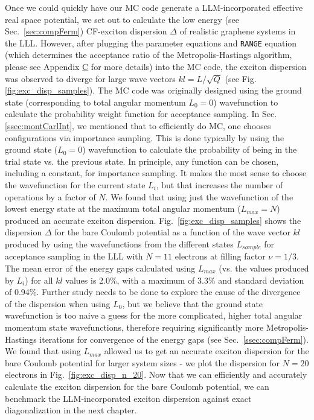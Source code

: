     Once we could quickly have our MC code generate a LLM-incorporated effective real space potential, we set out to calculate the low energy (see Sec.~\ref{sec:compFerm}) CF-exciton dispersion $\Delta$ of realistic graphene systems in the LLL. However, after plugging the parameter equations and \texttt{RANGE} equation (which determines the acceptance ratio of the Metropolis-Hastings algorithm, please see Appendix \hyperref[appendixC]{C} for more details) into the MC code, the exciton dispersion was observed to diverge for large wave vectors $kl=L/\sqrt{Q}$ (see Fig. \ref{fig:exc_disp_samples}). The MC code was originally designed using the ground state (corresponding to total angular momentum $L_0=0$) wavefunction to calculate the probability weight function for acceptance sampling. In Sec. \ref{ssec:montCarlInt}, we mentioned that to efficiently do MC, one chooses configurations via importance sampling. This is done typically by using the ground state ($L_0=0$) wavefunction to calculate the probability of being in the trial state vs. the previous state. In principle, any function can be chosen, including a constant, for importance sampling. It makes the most sense to choose the wavefunction for the current state $L_i$, but that increases the number of operations by a factor of $N$. We found that using just the wavefunction of the lowest energy state at the maximum total angular momentum ($L_{max}=N$) produced an accurate exciton dispersion. Fig.~\ref{fig:exc_disp_samples} shows the dispersion $\Delta$ for the bare Coulomb potential as a function of the wave vector $kl$ produced by using the wavefunctions from the different states $L_{sample}$ for acceptance sampling in the LLL with $N=11$ electrons at filling factor $\nu=1/3$. The mean error of the energy gaps calculated using $L_{max}$ (vs. the values produced by $L_i$) for all $kl$ values is 2.0\%, with a maximum of 3.3\% and standard deviation of 0.94\%. Further study needs to be done to explore the cause of the divergence of the dispersion when using $L_0$, but we believe that the ground state wavefunction is too naive a guess for the more complicated, higher total angular momentum state wavefunctions, therefore requiring significantly more Metropolis-Hastings iterations for convergence of the energy gaps (see Sec.~\ref{ssec:compFerm}). We found that using $L_{max}$ allowed us to get an accurate exciton dispersion for the bare Coulomb potential for larger system sizes - we plot the dispersion for $N=20$ electrons in Fig.~\ref{fig:exc_disp_n_20}. Now that we can efficiently and accurately calculate the exciton dispersion for the bare Coulomb potential, we can benchmark the LLM-incorporated exciton dispersion against exact diagonalization in the next chapter.
    
